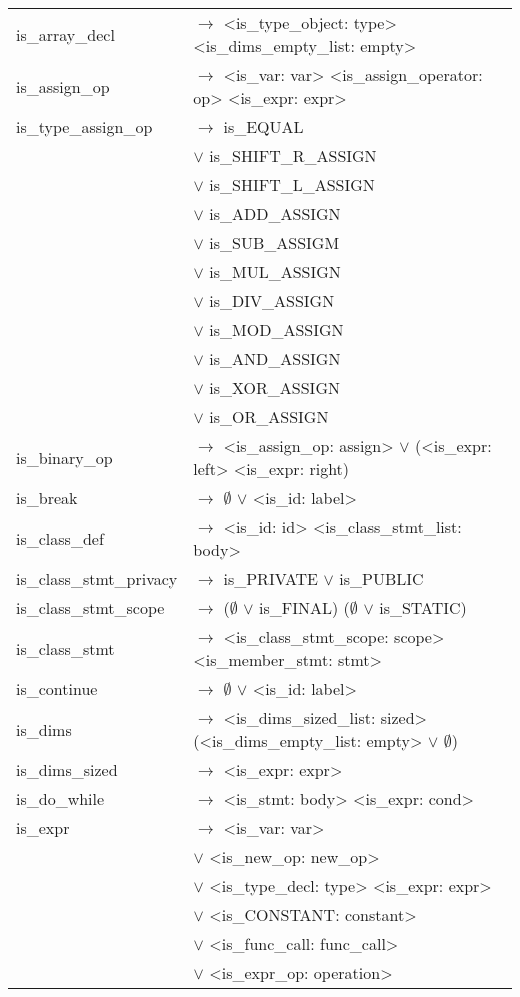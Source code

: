 \documentclass[a4paper]{article}
\begin{document}
\begin{tabular}{ll}
	is\_array\_decl 			& $\to$ <is\_type\_object: type> <is\_dims\_empty\_list: empty> \\
	is\_assign\_op				& $\to$ <is\_var: var> <is\_assign\_operator: op> <is\_expr: expr> \\
	is\_type\_assign\_op		& $\to$ is\_EQUAL \\
								& $\vee$ is\_SHIFT\_R\_ASSIGN \\
								& $\vee$ is\_SHIFT\_L\_ASSIGN \\
								& $\vee$ is\_ADD\_ASSIGN \\
								& $\vee$ is\_SUB\_ASSIGM \\
								& $\vee$ is\_MUL\_ASSIGN \\
								& $\vee$ is\_DIV\_ASSIGN \\
								& $\vee$ is\_MOD\_ASSIGN \\
								& $\vee$ is\_AND\_ASSIGN \\
								& $\vee$ is\_XOR\_ASSIGN \\
								& $\vee$ is\_OR\_ASSIGN \\
	is\_binary\_op				& $\to$ <is\_assign\_op: assign> $\vee$ (<is\_expr: left> <is\_expr: right) \\
	is\_break 					& $\to$ $\emptyset$ $\vee$ <is\_id: label> \\
	is\_class\_def				& $\to$ <is\_id: id> <is\_class\_stmt\_list: body> \\
	is\_class\_stmt\_privacy	& $\to$ is\_PRIVATE $\vee$ is\_PUBLIC\\	
	is\_class\_stmt\_scope		& $\to$ ($\emptyset$ $\vee$ is\_FINAL) ($\emptyset$ $\vee$ is\_STATIC) \\
	is\_class\_stmt 			& $\to$ <is\_class\_stmt\_scope: scope> <is\_member\_stmt: stmt> \\
	is\_continue				& $\to$ $\emptyset$ $\vee$ <is\_id: label> \\
	is\_dims					& $\to$ <is\_dims\_sized\_list: sized> (<is\_dims\_empty\_list: empty> $\vee$ $\emptyset$) \\
	is\_dims\_sized				& $\to$ <is\_expr: expr> \\
	is\_do\_while				& $\to$ <is\_stmt: body> <is\_expr: cond> \\
	is\_expr					& $\to$ <is\_var: var> \\
								& $\vee$ <is\_new\_op: new\_op> \\
								& $\vee$ <is\_type\_decl: type> <is\_expr: expr>\\
								& $\vee$ <is\_CONSTANT: constant> \\
								& $\vee$ <is\_func\_call: func\_call> \\
								& $\vee$ <is\_expr\_op: operation> \\


\end{tabular}
\end{document}
